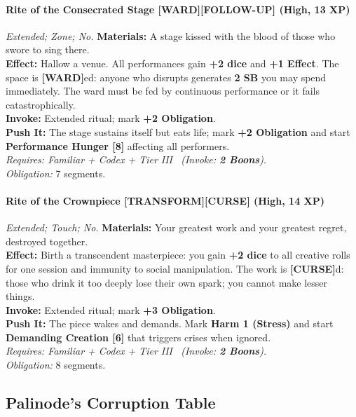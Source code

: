 \paragraph{Rite of the Consecrated Stage \textnormal{[WARD][FOLLOW-UP]} (High, 13 XP)} \emph{Extended; Zone; No.}
\textbf{Materials:} A stage kissed with the blood of those who swore to sing there.\\
\textbf{Effect:} Hallow a venue. All performances gain \textbf{+2 dice} and \textbf{+1 Effect}. The space is \textbf{[WARD]}ed: anyone who disrupts generates \textbf{2 SB} you may spend immediately. The ward must be fed by continuous performance or it fails catastrophically.\\
\textbf{Invoke:} Extended ritual; mark \textbf{+2 Obligation}.\\
\textbf{Push It:} The stage sustains itself but eats life; mark \textbf{+2 Obligation} and start \textbf{Performance Hunger [8]} affecting all performers.\\
\emph{Requires: Familiar + Codex + Tier III \ (\textit{Invoke:} \textbf{2 Boons}).}\\
\emph{Obligation:} 7 segments.

\paragraph{Rite of the Crownpiece \textnormal{[TRANSFORM][CURSE]} (High, 14 XP)} \emph{Extended; Touch; No.}
\textbf{Materials:} Your greatest work and your greatest regret, destroyed together.\\
\textbf{Effect:} Birth a transcendent masterpiece: you gain \textbf{+2 dice} to all creative rolls for one session and immunity to social manipulation. The work is \textbf{[CURSE]}d: those who drink it too deeply lose their own spark; you cannot make lesser things.\\
\textbf{Invoke:} Extended ritual; mark \textbf{+3 Obligation}.\\
\textbf{Push It:} The piece wakes and demands. Mark \textbf{Harm 1 (Stress)} and start \textbf{Demanding Creation [6]} that triggers crises when ignored.\\
\emph{Requires: Familiar + Codex + Tier III \ (\textit{Invoke:} \textbf{2 Boons}).}\\
\emph{Obligation:} 8 segments.

\subsection*{Palinode's Corruption Table}
\label{sec:palinode-corruption}

